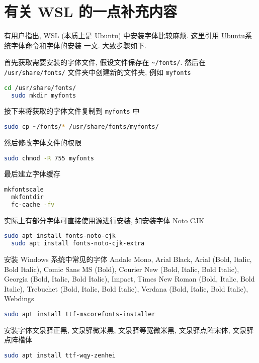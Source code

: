 
\chapter{有关 WSL 的一点补充内容}\label{chp:appendix:wsl}

有用户指出,
WSL (本质上是 Ubuntu) 中安装字体比较麻烦.
这里引用
\href{https://www.jianshu.com/p/e7f12b8c8602}{Ubuntu系统字体命令和字体的安装}
一文.
大致步骤如下.

首先获取需要安装的字体文件,
假设文件保存在 \verb|~/fonts/|.
然后在 \texttt{/usr/share/fonts/} 文件夹中创建新的文件夹,
例如 \texttt{myfonts}
\begin{lstlisting}[language=bash]
  cd /usr/share/fonts/
  sudo mkdir myfonts
\end{lstlisting}
接下来将获取的字体文件复制到 \texttt{myfonts} 中
\begin{lstlisting}[language=bash]
  sudo cp ~/fonts/* /usr/share/fonts/myfonts/ 
\end{lstlisting}
然后修改字体文件的权限
\begin{lstlisting}[language=bash]
  sudo chmod -R 755 myfonts
\end{lstlisting}
最后建立字体缓存
\begin{lstlisting}[language=bash]
  mkfontscale
  mkfontdir
  fc-cache -fv
\end{lstlisting}

实际上有部分字体可直接使用源进行安装,
如安装字体 Noto CJK
\begin{lstlisting}[language=bash]
  sudo apt install fonts-noto-cjk
  sudo apt install fonts-noto-cjk-extra
\end{lstlisting}
安装 Windows 系统中常见的字体 Andale Mono,
Arial Black,
Arial (Bold, Italic, Bold Italic),
Comic Sans MS (Bold),
Courier New (Bold, Italic, Bold Italic),
Georgia (Bold, Italic, Bold Italic),
Impact,
Times New Roman (Bold, Italic, Bold Italic),
Trebuchet (Bold, Italic, Bold Italic),
Verdana (Bold, Italic, Bold Italic),
Webdings
\begin{lstlisting}[language=bash]
  sudo apt install ttf-mscorefonts-installer
\end{lstlisting}
安装字体文泉驿正黑,
文泉驿微米黑,
文泉驿等宽微米黑,
文泉驿点阵宋体,
文泉驿点阵楷体
\begin{lstlisting}[language=bash]
  sudo apt install ttf-wqy-zenhei
\end{lstlisting}
